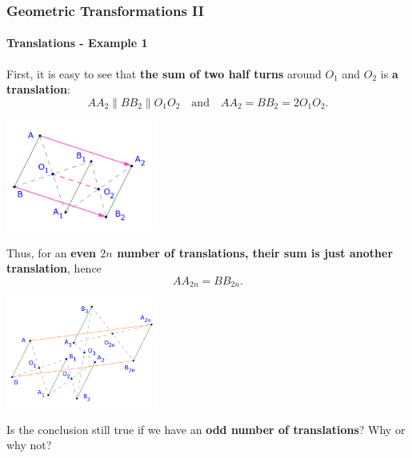 \documentclass[8pt,xcolor=table,dvipsnames]{beamer}
\begin{document}
\begin{frame}[t]
    \frametitle{Geometric Transformations II}
    \framesubtitle{Translations - Example 1}
    \begin{overprint}
        First, it is easy to see that \textbf{the sum of two half turns} around $O_1$ and $O_2$ is \textbf{a translation}:
        \[ 
            AA_2 \parallel BB_2 \parallel O_1O_2 \quad \text{and} \quad AA_2 = BB_2 = 2O_1O_2.
        \]
        \begin{center}
            \includegraphics[width=5cm]{./svg/pdf/translation-1b.pdf}
        \end{center}
        Thus, for an \textbf{even $2n$ number of translations, their sum is just another translation}, hence
        \[
            AA_{2n} = BB_{2n}.
        \]
        \begin{center}
            \includegraphics[width=5cm]{./svg/pdf/translation-1.pdf}
        \end{center}
    
        \bigbreak
        Is the conclusion still true if we have an \textbf{odd number of translations}? Why or why not?        
    \end{overprint}
\end{frame}
\end{document}
